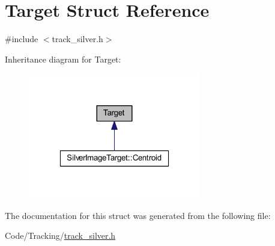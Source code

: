 \hypertarget{struct_target}{\section{\-Target \-Struct \-Reference}
\label{struct_target}
}


{\ttfamily \#include $<$track\-\_\-silver.\-h$>$}



\-Inheritance diagram for \-Target\-:\nopagebreak
\begin{figure}[H]
\begin{center}
\leavevmode
\includegraphics[width=214pt]{struct_target__inherit__graph}
\end{center}
\end{figure}


\-The documentation for this struct was generated from the following file\-:\begin{DoxyCompactItemize}
\item 
\-Code/\-Tracking/\hyperlink{track__silver_8h}{track\-\_\-silver.\-h}\end{DoxyCompactItemize}
